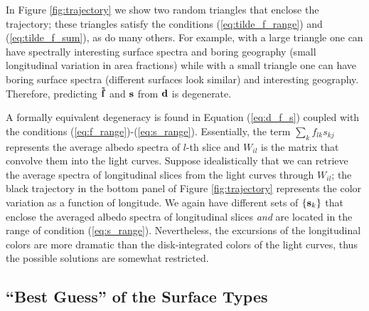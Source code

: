 \documentclass[iop,numberedappendix,apj]{emulateapj}
\def\fast{\tilde f}
\begin{document}
In Figure \ref{fig:trajectory} we show two random triangles that enclose the trajectory; these triangles satisfy the conditions (\ref{eq:tilde_f_range}) and (\ref{eq:tilde_f_sum}), as do many others. 
For example, with a large triangle one can have spectrally interesting surface spectra and boring geography (small longitudinal variation in area fractions) while with a small triangle one can have boring surface spectra (different surfaces look similar) and interesting geography. 
Therefore, predicting ${\bf \fast }$ and ${\bf s}$ from ${\bf d}$ is degenerate.  

A formally equivalent degeneracy is found in Equation (\ref{eq:d_f_s}) coupled with the conditions (\ref{eq:f_range})-(\ref{eq:s_range}). 
Essentially, the term $\sum _k f_{lk} s_{kj}$ represents the average albedo spectra of $l$-th slice and $W_{il}$ is the matrix that convolve them into the light curves. 
Suppose idealistically that we can retrieve the average spectra of longitudinal slices from the light curves through $W_{il}$; the black trajectory in the bottom panel of Figure \ref{fig:trajectory} represents the color variation as a function of longitude.  
We again have different sets of $\{ {\bf s}_k \}$ that enclose the averaged albedo spectra of longitudinal slices {\it and} are located in the range of condition (\ref{eq:s_range}). 
Nevertheless, the excursions of the longitudinal colors are more dramatic than the disk-integrated colors of the light curves, thus the possible solutions are somewhat restricted. 

\subsection{``Best Guess'' of the Surface Types}
\label{ss:guess}
\end{document}
